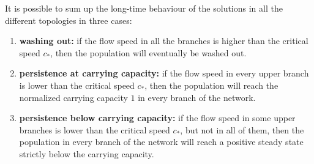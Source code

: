 \begin{remark}
    It is possible to sum up the long-time behaviour of the solutions in all the different topologies in three cases:
    \begin{enumerate}[label=(\roman*)]
        \item \textbf{washing out:} if the flow speed in all the branches is higher than the critical speed \(c_*\), then the population will eventually be washed out.
        \item \textbf{persistence at carrying capacity:} if the flow speed in every upper branch is lower than the critical speed \(c_*\), then the population will reach the normalized carrying capacity \(1\) in every branch of the network.
        \item \textbf{persistence below carrying capacity:} if the flow speed in some upper branches is lower than the critical speed \(c_*\), but not in all of them, then the population in every branch of the network will reach a positive steady state strictly below the carrying capacity.
    \end{enumerate}
\end{remark}
